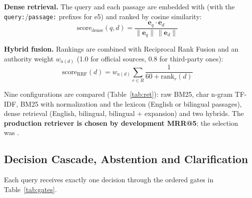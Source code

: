 \documentclass[12pt,a4paper]{article}
\begin{document}
\textbf{Dense retrieval.} The query and each passage are embedded with \RDenseModel{} (with the
\texttt{query:}/\texttt{passage:} prefixes for e5) and ranked by cosine similarity:
\begin{equation}
\text{score}_{\text{dense}}(q, d) = \frac{\mathbf{e}_q \cdot \mathbf{e}_d}{\lVert \mathbf{e}_q \rVert \, \lVert \mathbf{e}_d \rVert}
\end{equation}

\textbf{Hybrid fusion.} Rankings are combined with Reciprocal Rank Fusion and an authority weight $w_{a(d)}$ (1.0 for
official sources, 0.8 for third-party ones):
\begin{equation}
\text{score}_{\text{RRF}}(d) = w_{a(d)} \sum_{r \in R} \frac{1}{60 + \text{rank}_r(d)}
\end{equation}

Nine configurations are compared (Table~\ref{tab:ret}): raw BM25, char n-gram TF-IDF, BM25 with normalization and the
lexicon (English or bilingual passages), dense retrieval (English, bilingual, bilingual + expansion) and two hybrids. The
\textbf{production retriever is chosen by development MRR@5}; the selection was \RFinalMethod.

\subsection{Decision Cascade, Abstention and Clarification}
Each query receives exactly one decision through the ordered gates in Table~\ref{tab:gates}.
\end{document}
